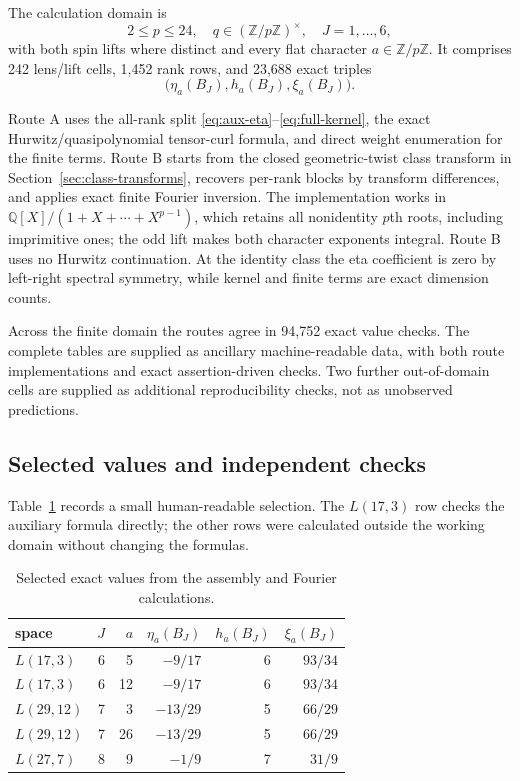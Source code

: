 \documentclass[11pt]{article}
\theoremstyle{definition}
\newcommand{\etaInv}{\eta}
\newcommand{\Z}{\mathbb{Z}}
\newcommand{\Q}{\mathbb{Q}}
\begin{document}
The calculation domain is
\[
 2\leq p\leq24,
 \quad q\in(\Z/p\Z)^\times,
 \quad J=1,\ldots,6,
\]
with both spin lifts where distinct and every flat character $a\in\Z/p\Z$.
It comprises 242 lens/lift cells, 1,452 rank rows, and 23,688 exact triples
\[
 \bigl(\etaInv_a(B_J),h_a(B_J),\xi_a(B_J)\bigr).
\]

Route A uses the all-rank split
\eqref{eq:aux-eta}--\eqref{eq:full-kernel}, the exact
Hurwitz/quasipolynomial tensor-curl formula, and direct weight enumeration for
the finite terms.  Route B starts from the closed geometric-twist class
transform in Section~\ref{sec:class-transforms}, recovers per-rank blocks by
transform differences, and applies exact finite Fourier inversion.  The
implementation works in
$\Q[X]/(1+X+\cdots+X^{p-1})$, which retains all nonidentity $p$th roots,
including imprimitive ones; the odd lift makes both character exponents
integral.  Route B uses no Hurwitz continuation.  At the identity
class the eta coefficient is zero by left-right spectral symmetry, while kernel and
finite terms are exact dimension counts.

Across the finite domain the routes agree in 94,752 exact value checks.  The
complete tables are supplied as ancillary machine-readable data, with both
route implementations and exact assertion-driven checks.  Two further
out-of-domain cells are supplied as additional reproducibility checks, not
as unobserved predictions.

\subsection{Selected values and independent checks}

Table~\ref{tab:selected-values} records a small human-readable selection.
The $L(17,3)$ row checks the auxiliary formula directly; the other rows were
calculated outside the working domain without changing the formulas.

\begin{table}[ht]
\centering
\small
\begin{tabular}{@{}lrrrrr@{}}
\toprule
space & $J$ & $a$ & $\etaInv_a(B_J)$ & $h_a(B_J)$ & $\xi_a(B_J)$\\
\midrule
$L(17,3)$  & 6 & 5  & $-9/17$  & 6 & $93/34$\\
$L(17,3)$  & 6 & 12 & $-9/17$  & 6 & $93/34$\\
$L(29,12)$ & 7 & 3  & $-13/29$ & 5 & $66/29$\\
$L(29,12)$ & 7 & 26 & $-13/29$ & 5 & $66/29$\\
$L(27,7)$  & 8 & 9  & $-1/9$   & 7 & $31/9$\\
\bottomrule
\end{tabular}
\caption{Selected exact values from the assembly and Fourier calculations.}
\label{tab:selected-values}
\end{table}
\end{document}
